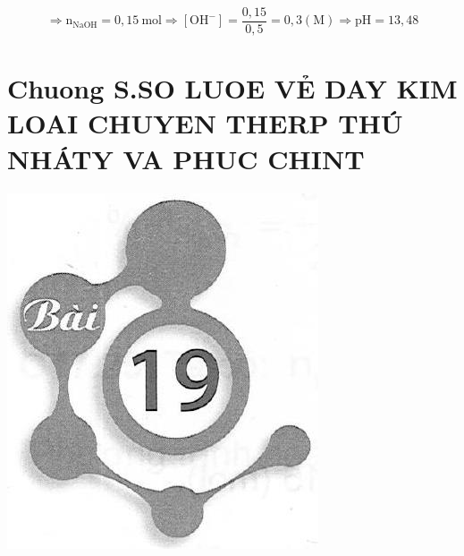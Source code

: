 \documentclass[10pt]{article}
\begin{document}
$$
\Rightarrow \mathrm{n}_{\mathrm{NaOH}}=0,15 \mathrm{~mol} \Rightarrow\left[\mathrm{OH}^{-}\right]=\frac{0,15}{0,5}=0,3(\mathrm{M}) \Rightarrow \mathrm{pH}=13,48
$$

\section*{Chuong S.SO LUOE VẺ DAY KIM LOAI CHUYEN THERP THÚ NHÁTY VA PHUC CHINT}
\begin{center}
\includegraphics[max width=\textwidth]{2025_10_23_b4e16b74380d0f7e7700g-115}
\end{center}
\end{document}
